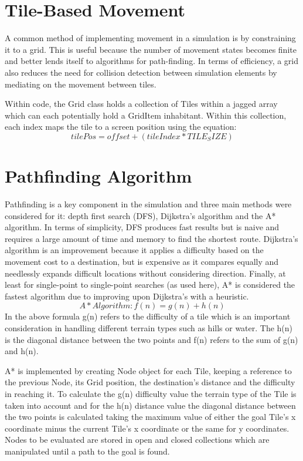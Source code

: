 \documentclass[a4paper, oneside, 11pt]{report}
\begin{document}
\section{Tile-Based Movement}\label{grid}
A common method of implementing movement in a simulation is by constraining it to a grid. This is useful because the number of movement states becomes finite and better lends itself to algorithms for path-finding. In terms of efficiency, a grid also reduces the need for collision detection between simulation elements by mediating on the movement between tiles.

Within code, the Grid class holds a collection of Tiles within a jagged array which can each potentially hold a GridItem inhabitant. Within this collection, each index maps the tile to a screen position using the equation:
\[tilePos = offset + (tileIndex * TILE_SIZE)\]

\section{Pathfinding Algorithm}\label{pathfinding}
Pathfinding is a key component in the simulation and three main methods were considered for it: depth first search (DFS), Dijkstra's algorithm and the A* algorithm. In terms of simplicity, DFS produces fast results but is naive and requires a large amount of time and memory to find the shortest route. Dijkstra's algorithm is an improvement because it applies a difficulty based on the movement cost to a destination, but is expensive as it compares equally and needlessly expands difficult locations without considering direction. Finally, at least for single-point to single-point searches (as used here), A* is considered the fastest algorithm \cite{belwariar} due to improving upon Dijkstra's with a heuristic. 
\[A* Algorithm: f(n) = g(n) + h(n)\]
In the above formula g(n) refers to the difficulty of a tile which is an important consideration in handling different terrain types such as hills or water. The h(n) is the diagonal distance between the two points and f(n) refers to the sum of g(n) and h(n).

A* is implemented by creating Node object for each Tile, keeping a reference to the previous Node, its Grid position, the destination's distance and the difficulty in reaching it. To calculate the g(n) difficulty value the terrain type of the Tile is taken into account and for the h(n) distance value the diagonal distance between the two points is calculated taking the maximum value of either the goal Tile's x coordinate minus the current Tile's x coordinate or the same for y coordinates. Nodes to be evaluated are stored in open and closed collections which are manipulated until a path to the goal is found.
\end{document}

